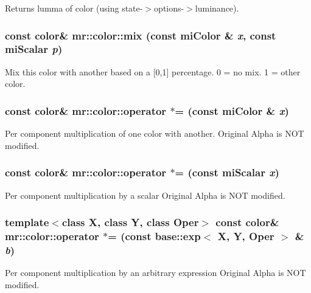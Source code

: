 Returns lumma of color (using state-$>$options-$>$luminance). 

\subsubsection{\setlength{\rightskip}{0pt plus 5cm}const {\bf color}\& mr::color::mix (const mi\-Color \& {\em x}, const mi\-Scalar {\em p})\hspace{0.3cm}{\tt  [inline]}}\label{structmr_1_1color_z15_1}


Mix this color with another based on a [0,1] percentage. 0 = no mix. 1 = other color. 
\subsubsection{\setlength{\rightskip}{0pt plus 5cm}const {\bf color}\& mr::color::operator $\ast$= (const mi\-Color \& {\em x})\hspace{0.3cm}{\tt  [inline]}}\label{structmr_1_1color_z14_9}


Per component multiplication of one color with another. Original Alpha is NOT modified. 
\subsubsection{\setlength{\rightskip}{0pt plus 5cm}const {\bf color}\& mr::color::operator $\ast$= (const mi\-Scalar {\em x})\hspace{0.3cm}{\tt  [inline]}}\label{structmr_1_1color_z14_8}


Per component multiplication by a scalar Original Alpha is NOT modified. 
\subsubsection{\setlength{\rightskip}{0pt plus 5cm}template$<$class X, class Y, class Oper$>$ const {\bf color}\& mr::color::operator $\ast$= (const {\bf base::exp}$<$ X, Y, Oper $>$ \& {\em b})\hspace{0.3cm}{\tt  [inline]}}\label{structmr_1_1color_z14_7}


Per component multiplication by an arbitrary expression Original Alpha is NOT modified. 
